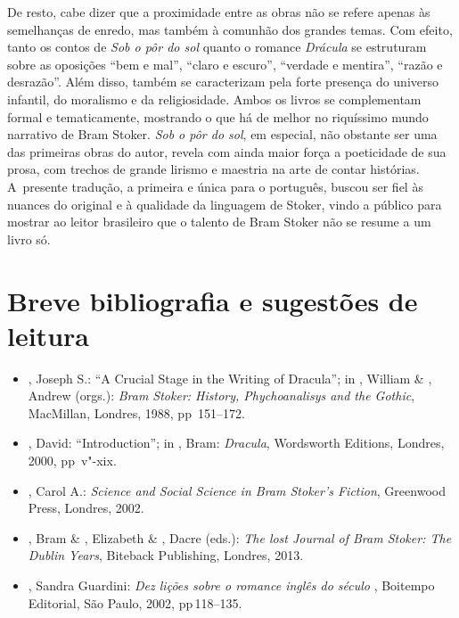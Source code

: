 De resto, cabe dizer que a proximidade entre as obras não se refere
apenas às semelhanças de enredo, mas também à comunhão dos grandes
temas. Com efeito, tanto os contos de \emph{Sob o pôr do sol} quanto o
romance \emph{Drácula} se estruturam sobre as oposições ``bem e mal'',
``claro e escuro'', ``verdade e mentira'', ``razão e desrazão''. Além
disso, também se caracterizam pela forte presença do universo infantil,
do moralismo e da religiosidade. Ambos os livros se complementam formal
e tematicamente, mostrando o que há de melhor no riquíssimo mundo
narrativo de Bram Stoker. \emph{Sob o pôr do sol}, em especial, não
obstante ser uma das primeiras obras do autor, revela com ainda maior
força a poeticidade de sua prosa, com trechos de grande lirismo e
maestria na arte de contar histórias. A~presente tradução, a primeira e
única para o português, buscou ser fiel às nuances do original e à
qualidade da linguagem de Stoker, vindo a público para mostrar ao leitor
brasileiro que o talento de Bram Stoker não se resume a um livro só.

\asterisc{}
  



\section{Breve bibliografia e sugestões de leitura}


\begin{itemize}
\small
\item
  , Joseph S.: ``A Crucial Stage in the Writing of Dracula''; in
  , William \& , Andrew (orgs.): \emph{Bram Stoker: History,
  Phychoanalisys and the Gothic}, MacMillan, Londres, 1988, pp\,  151--172.
\item
  , David: ``Introduction''; in , Bram: \emph{Dracula},
  Wordsworth Editions, Londres, 2000, pp\, v"-xix.
\item
  , Carol A.: \emph{Science and Social Science in Bram Stoker's
  Fiction}, Greenwood Press, Londres, 2002.
\item
  , Bram \& , Elizabeth \& , Dacre (eds.): \emph{The
  lost Journal of Bram Stoker: The Dublin Years}, Biteback Publishing,
  Londres, 2013.
\item
  , Sandra Guardini: \emph{Dez lições sobre o romance inglês
  do século }, Boitempo Editorial, São Paulo, 2002, pp\,118--135.
\end{itemize}

